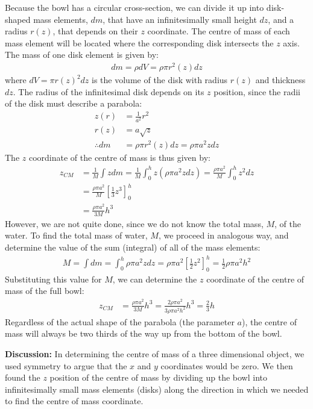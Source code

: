\begin{example}
Because the bowl has a circular cross-section, we can divide it up into disk-shaped mass elements, $dm$, that have an infinitesimally small height $dz$, and a radius $r(z)$, that depends on their $z$ coordinate. The centre of mass of each mass element will be located where the corresponding disk intersects the $z$ axis. The mass of one disk element is given by:
\begin{align*}
dm = \rho dV = \rho \pi r^2(z) dz
\end{align*}
where $dV = \pi r(z)^2 dz$ is the volume of the disk with radius $r(z)$ and thickness $dz$. The radius of the infinitesimal disk depends on its $z$ position, since the radii of the disk must describe a parabola:
\begin{align*}
z(r) &= \frac{1}{a^2}r^2\\
r(z) &= a\sqrt z\\
\therefore dm &= \rho \pi r^2(z) dz= \rho \pi a^2  z dz
\end{align*}
The $z$ coordinate of the centre of mass is thus given by:
\begin{align*}
z_{CM} &=  \frac{1}{M}\int z dm =\frac{1}{M}\int_0^h z  (\rho \pi a^2 z dz)=\frac{\rho \pi a^2}{M}\int_0^h z^2dz \\
&=\frac{\rho \pi a^2}{M}\left[ \frac{1}{3}z^3 \right]_0^h\\
&=\frac{\rho \pi a^2}{3M}h^3
\end{align*}
However, we are not quite done, since we do not know the total mass, $M$, of the water. To find the total mass of water, $M$, we proceed in analogous way, and determine the value of the sum (integral) of all of the mass elements:
\begin{align*}
M = \int dm = \int_0^h \rho \pi a^2 z dz = \rho \pi a^2 \left[ \frac{1}{2}z^2 \right]_0^h= \frac{1}{2}\rho \pi a^2 h^2
\end{align*}
Substituting this value for $M$, we can determine the $z$ coordinate of the centre of mass of the full bowl:
\begin{align*}
z_{CM} &=\frac{\rho \pi a^2}{3M}h^3 = \frac{2\rho \pi a^2}{3\rho \pi a^2 h^2}h^3=\frac{2}{3}h
\end{align*}
Regardless of the actual shape of the parabola (the parameter $a$), the centre of mass will always be two thirds of the way up from the bottom of the bowl.

\textbf{Discussion: }In determining the centre of mass of a three dimensional object, we used symmetry to argue that the $x$ and $y$ coordinates would be zero. We then found the $z$ position of the centre of mass by dividing up the bowl into infinitesimally small mass elements (disks) along the direction in which we needed to find the centre of mass coordinate.
\end{example}

